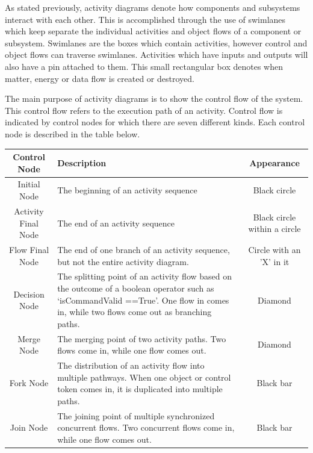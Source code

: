 \documentclass{article}
\begin{document}
As stated previously, activity diagrams denote how components and
subsystems interact with each other. This is accomplished through the
use of swimlanes which keep separate the individual activities and
object flows of a component or subsystem. Swimlanes are the boxes
which contain activities, however control and object flows can
traverse swimlanes. Activities which have inputs and outputs will also
have a pin attached to them. This small rectangular box denotes when
matter, energy or data flow is created or destroyed.  

The main purpose of activity diagrams is to show the control flow of
the system. This control flow refers to the execution path of an
activity. Control flow is indicated by control nodes for which there
are seven different kinds. Each control node is described in the table below.
\begin{table}[H]
  \begin{center}
    \begin{tabular}{c|p{7cm}|c}
      \hline
      Control Node & Description & Appearance \\
      \hline
      \hline
      Initial Node & The beginning of an activity sequence & Black
      circle \\
      \hline
      Activity Final Node & The end of an activity sequence & Black
      circle within a circle \\
      \hline
      Flow Final Node & The end of one branch of an activity sequence,
      but not the entire activity diagram. & Circle with an 'X' in it
      \\
      \hline
      Decision Node & The splitting point of an activity flow based on
      the outcome of a boolean operator such as ‘isCommandValid
      ==True’. One flow in comes in, while two flows come out as
      branching paths. & Diamond \\
      \hline
      Merge Node & The merging point of two activity paths. Two flows
      come in, while one flow comes out. & Diamond \\
      \hline
      Fork Node & The distribution of an activity flow into multiple
      pathways. When one object or control token comes in, it is
      duplicated into multiple paths. & Black bar \\
      \hline
      Join Node & The joining point of multiple synchronized
      concurrent flows. Two concurrent flows come in, while one flow
      comes out. & Black bar \\
      \hline
      \hline
    \end{tabular}
  \end{center}
\end{table}
\end{document}

